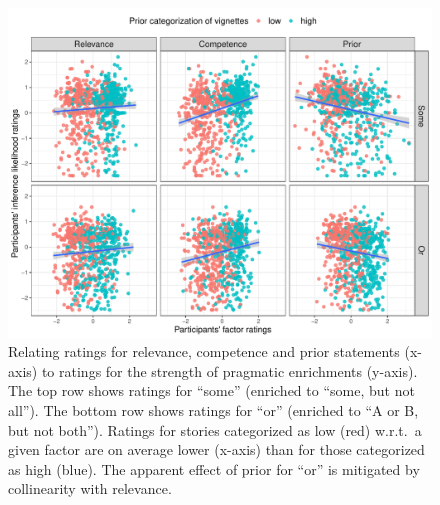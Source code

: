 \documentclass[11pt,letterpaper]{article}
\begin{document}
\newpage



\begin{figure}
  \includegraphics[scale=0.5]{byFactor-byPrior-raw-scatter.pdf}
 \caption{Relating ratings for relevance, competence and prior statements (x-axis) to ratings for the strength of pragmatic enrichments (y-axis). 
 The top row shows ratings for ``some'' (enriched to ``some, but not all''). The bottom row shows ratings for ``or'' (enriched to ``A or B, but not both''). Ratings for stories categorized as low (red) w.r.t.~a given factor are on average lower (x-axis) than for those categorized as high (blue). The apparent effect of prior for ``or'' is mitigated by collinearity with relevance.}
    \label{by-item-ratings}
\end{figure}
\end{document}
